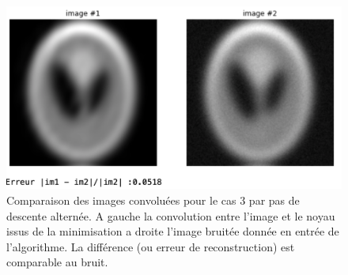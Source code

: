 \documentclass[a4paper]{article}
\begin{document}
%
%
\begin{figure}[h]
\includegraphics[scale=0.6]{figures/convolve-cas2}	
\caption{Comparaison des images convoluées pour le cas 3 par pas de descente alternée. A gauche la convolution entre l'image et le noyau issus de la minimisation a droite l'image bruitée donnée en entrée de l'algorithme. La différence (ou erreur de reconstruction) est comparable au bruit.}
\end{figure}
%
\end{document}
